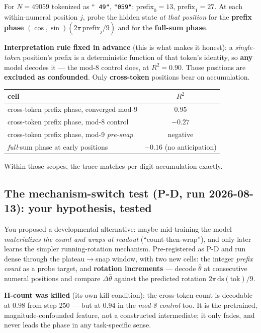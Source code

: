 \documentclass[11pt]{article}
\newcommand{\ds}{\mathrm{ds}}
\begin{document}
For $N = 49059$ tokenized as \texttt{" 49"}, \texttt{"059"}:
$\mathrm{prefix}_0 = 13$, $\mathrm{prefix}_1 = 27$. At each within-numeral
position $j$, probe the hidden state \emph{at that position} for the
\textbf{prefix phase} $(\cos,\sin)(2\pi\,\mathrm{prefix}_j/9)$ and for the
\textbf{full-sum phase}.

\textbf{Interpretation rule fixed in advance} (this is what makes it honest): a
\emph{single-token} position's prefix is a deterministic function of that token's
identity, so \textbf{any} model decodes it --- the mod-8 control does, at
$R^2 = 0.90$. Those positions are \textbf{excluded as confounded}. Only
\textbf{cross-token} positions bear on accumulation.

\begin{center}
\begin{tabular}{@{}lc@{}}
\toprule
\textbf{cell} & $R^2$ \\
\midrule
cross-token prefix phase, converged mod-9 & $\mathbf{0.95}$ \\
cross-token prefix phase, mod-8 control & $\mathbf{-0.27}$ \\
cross-token prefix phase, mod-9 \emph{pre-snap} & negative \\
\emph{full}-sum phase at early positions & $\mathbf{-0.16}$ (no anticipation) \\
\bottomrule
\end{tabular}
\end{center}

Within those scopes, the trace matches per-digit accumulation exactly.

\subsection*{The mechanism-switch test (P-D, run 2026-08-13): your hypothesis, tested}

You proposed a developmental alternative: maybe mid-training the model
\emph{materializes the count and wraps at readout} (``count-then-wrap''), and only
later learns the simpler running-rotation mechanism. Pre-registered as P-D and
run dense through the plateau$\to$snap window, with two new cells: the integer
\emph{prefix count} as a probe target, and \textbf{rotation increments} ---
decode $\hat{\theta}$ at consecutive numeral positions and compare
$\Delta\hat{\theta}$ against the predicted rotation $2\pi\,\ds(\mathrm{tok})/9$.

\textbf{H-count was killed} (its own kill condition): the cross-token count is
decodable at $0.98$ from step 250 --- but at $0.94$ in the \emph{mod-8 control}
too. It is the pretrained, magnitude-confounded feature, not a constructed
intermediate; it only fades, and never leads the phase in any task-specific
sense.
\end{document}
